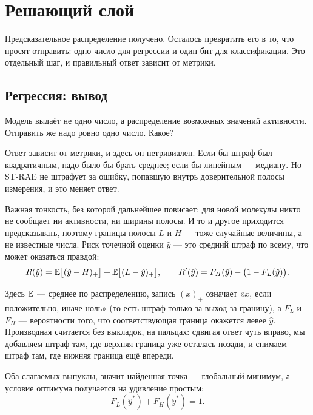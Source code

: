 \section{Решающий слой}
\label{sec:decision}

Предсказательное распределение получено. Осталось превратить его в то, что просят отправить: одно число
для регрессии и один бит для классификации. Это отдельный шаг, и правильный ответ зависит от метрики.

\subsection{Регрессия: вывод}

Модель выдаёт не одно число, а распределение возможных значений активности. Отправить же надо
ровно одно число. Какое?

Ответ зависит от метрики, и здесь он нетривиален. Если бы штраф был квадратичным, надо было бы
брать среднее; если бы линейным --- медиану. Но ST-RAE не штрафует за ошибку, попавшую внутрь
доверительной полосы измерения, и это меняет ответ.

Важная тонкость, без которой дальнейшее повисает: для новой молекулы никто не сообщает ни
активности, ни ширины полосы. И то и другое приходится предсказывать, поэтому границы полосы
$L$ и $H$ --- тоже случайные величины, а не известные числа. Риск точечной оценки $\hat y$
--- это средний штраф по всему, что может оказаться правдой:
\begin{equation}
R(\hat y) = \mathbb{E}\bigl[(\hat y - H)_+\bigr] + \mathbb{E}\bigl[(L - \hat y)_+\bigr],
\qquad
R'(\hat y) = F_H(\hat y) - \bigl(1 - F_L(\hat y)\bigr) .
\label{eq:risk}
\end{equation}

Здесь $\mathbb{E}$ --- среднее по распределению, запись $(x)_+$ означает «$x$, если положительно, иначе
ноль» (то есть штраф только за выход за границу), а $F_L$ и $F_H$ --- вероятности того, что
соответствующая граница окажется левее $\hat y$. Производная считается без выкладок, на пальцах:
сдвигая ответ чуть вправо, мы добавляем штраф там, где верхняя граница уже осталась позади, и
снимаем штраф там, где нижняя граница ещё впереди.

Оба слагаемых выпуклы, значит найденная точка --- глобальный минимум, а условие оптимума
получается на удивление простым:
\begin{equation}
F_L(\hat y^*) + F_H(\hat y^*) = 1 .
\label{eq:opt}
\end{equation}

